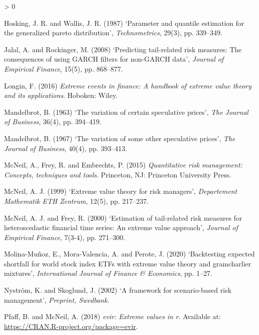 \documentclass[a4paper,11pt]{article}
\newlength{\cslhangindent}
\newenvironment{CSLReferences}[2] %
 {%
  \setlength{\parindent}{0pt}
  \ifodd #1 \everypar{\setlength{\hangindent}{\cslhangindent}}\ignorespaces\fi
  \ifnum #2 > 0
  \setlength{\parskip}{#2\baselineskip}
  \fi
 }%
 {}
\theoremstyle{definition}
\theoremstyle{definition}
\theoremstyle{definition}
\theoremstyle{definition}
\theoremstyle{remark}
\begin{document}
\begin{CSLReferences}{0}{0}
\leavevmode\hypertarget{ref-hosking1987parameter}{}%
Hosking, J. R. and Wallis, J. R. (1987) {`Parameter and quantile estimation for the generalized pareto distribution'}, \emph{Technometrics}, 29(3), pp. 339--349.

\leavevmode\hypertarget{ref-jalal2008predicting}{}%
Jalal, A. and Rockinger, M. (2008) {`Predicting tail-related risk measures: The consequences of using GARCH filters for non-GARCH data'}, \emph{Journal of Empirical Finance}, 15(5), pp. 868--877.

\leavevmode\hypertarget{ref-longin2016extreme}{}%
Longin, F. (2016) \emph{Extreme events in finance: A handbook of extreme value theory and its applications}. Hoboken: Wiley.

\leavevmode\hypertarget{ref-mandelbrot1963}{}%
Mandelbrot, B. (1963) {`The variation of certain speculative prices'}, \emph{The Journal of Business}, 36(4), pp. 394--419.

\leavevmode\hypertarget{ref-mandelbrot1967}{}%
Mandelbrot, B. (1967) {`The variation of some other speculative prices'}, \emph{The Journal of Business}, 40(4), pp. 393--413.

\leavevmode\hypertarget{ref-mcneil2015quantitative}{}%
McNeil, A., Frey, R. and Embrechts, P. (2015) \emph{Quantitative risk management: Concepts, techniques and tools}. Princeton, NJ: Princeton University Press.

\leavevmode\hypertarget{ref-mcneil1999extreme}{}%
McNeil, A. J. (1999) {`Extreme value theory for risk managers'}, \emph{Departement Mathematik ETH Zentrum}, 12(5), pp. 217--237.

\leavevmode\hypertarget{ref-mcneil2000estimation}{}%
McNeil, A. J. and Frey, R. (2000) {`Estimation of tail-related risk measures for heteroscedastic financial time series: An extreme value approach'}, \emph{Journal of Empirical Finance}, 7(3-4), pp. 271--300.

\leavevmode\hypertarget{ref-MolinaMuoz2020}{}%
Molina-Muñoz, E., Mora-Valencia, A. and Perote, J. (2020) {`Backtesting expected shortfall for world stock index {ETFs} with extreme value theory and gram{{}}charlier mixtures'}, \emph{International Journal of Finance {\&} Economics}, pp. 1--27.

\leavevmode\hypertarget{ref-nystrom2002framework}{}%
Nyström, K. and Skoglund, J. (2002) {`A framework for scenario-based risk management'}, \emph{Preprint, Swedbank}.

\leavevmode\hypertarget{ref-evir}{}%
Pfaff, B. and McNeil, A. (2018) \emph{{evir}: Extreme values in r}. Available at: \url{https://CRAN.R-project.org/package=evir}.


\end{CSLReferences}
\end{document}
